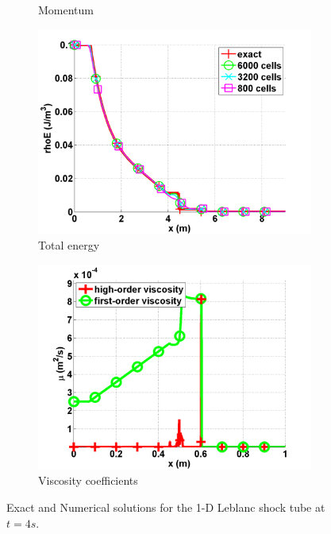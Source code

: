 \documentclass[preprint,10pt]{elsarticle}
\begin{document}
\begin{figure}[H]
\begin{subfigure}[b]{0.495\textwidth}
                \caption{Momentum}
                \label{fig:1d_leblanc_density}
        \end{subfigure}
        \begin{subfigure}[b]{0.495\textwidth}
                \centering
                \includegraphics[width=\textwidth]{Leblanc_exact_and_numerical_stt_total_energy_6000.png}
                \caption{Total energy}
                \label{fig:1d_leblanc_press}
        \end{subfigure}
        \begin{subfigure}[b]{0.495\textwidth}
                \centering
                \includegraphics[width=\textwidth]{Leblanc_viscosity_numerical_6000.png}
                \caption{Viscosity coefficients}
                \label{fig:1d_leblanc_visc}
        \end{subfigure}
        \caption{Exact and Numerical solutions for the 1-D Leblanc shock tube at $t=4 s$.}\label{fig:1d_leblanc}
\end{figure}
\end{document}
